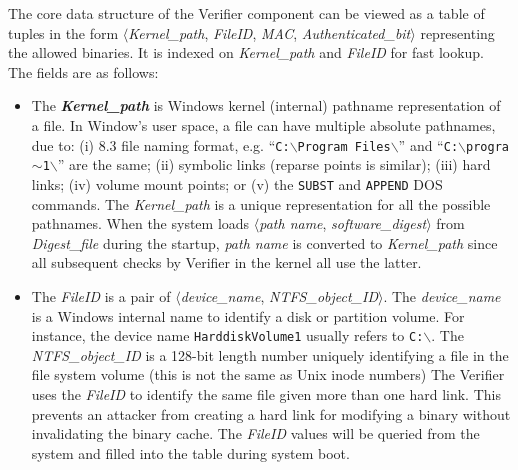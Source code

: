 The core data structure of the Verifier component can be viewed
as a table of tuples in the form
$\langle${\it Kernel\_path}, {\it FileID}, {\it MAC}, 
{\it Authenticated\_bit}$\rangle$
representing the allowed binaries.
It is indexed on {\it Kernel\_path} and {\it FileID} for fast lookup.
The fields are as follows:
\begin{itemize}
\item The {\bf {\it Kernel\_path}} is Windows kernel (internal) pathname 
representation of a file.
In Window's user space, a file can have multiple absolute pathnames, due to:
(i) 8.3 file naming format, e.g.
``{\tt C:\linebreak[0]$\backslash$\linebreak[0]Program Files\linebreak[0]$\backslash$\linebreak[0]}''
and
``{\tt C:\linebreak[0]$\backslash$\linebreak[0]progra$\sim$1\linebreak[0]$\backslash$\linebreak[0]}''
are the same;
(ii) symbolic links (reparse points is similar);
(iii) hard links;
(iv) volume mount points;
or
(v) the {\tt SUBST} and {\tt APPEND} DOS commands.
The {\it Kernel\_path} is a unique representation for all
the possible pathnames.
When the system loads $\langle${\it path name}, {\it software\_digest}$\rangle$ 
from {\it Digest\_file} during the startup, {\it path name} is converted to 
{\it Kernel\_path} since all subsequent checks by Verifier in the kernel 
all use the latter.

\item The {\it FileID} is a pair of $\langle${\it device\_name}, {\it NTFS\_object\_ID}$\rangle$.
The {\it device\_name} is a Windows internal name to identify a 
disk or partition volume.
For instance, the device name {\tt HarddiskVolume1} usually refers to {\tt C:$\backslash$}.
The {\it NTFS\_object\_ID} is a 128-bit length number uniquely identifying
a file in the file system volume (this is not the same as Unix inode numbers)
The Verifier uses the {\it FileID} 
to identify the same file given more than one hard link.
This prevents an attacker from creating a hard link for modifying
a binary without invalidating the binary cache.
The {\it FileID} values will be queried from the system and 
filled into the table during system boot.


\end{itemize}
